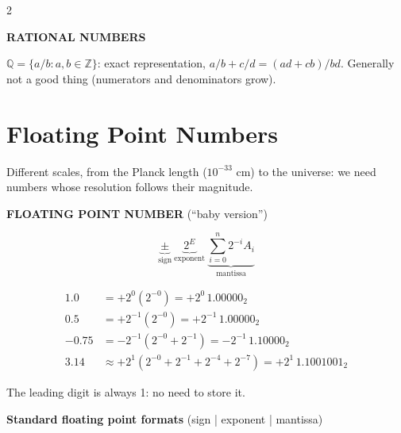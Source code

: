 \documentclass[a4paper,9pt]{extarticle}
\begin{document}
\begin{multicols}{2}
\begin{warning}
\begin{itemize}
\end{itemize}

\end{warning}


\begin{definition}

\textbf{RATIONAL NUMBERS}

$\mathbb{Q} = \{a/b : a, b \in \mathbb{Z}\}$: exact representation,
$a/b + c/d = (ad + cb)/bd$. Generally not a good thing (numerators and denominators grow).

\end{definition}



\section{Floating Point Numbers}


Different scales, from the Planck length ($10^{-33}$ cm) to the universe: we need numbers whose
resolution follows their magnitude.


\begin{definition}

\textbf{FLOATING POINT NUMBER} (``baby version'')

\[
\underbrace{\pm}_{\text{sign}} \ \underbrace{2^E}_{\text{exponent}}
\ \underbrace{\sum_{i=0}^{n} 2^{-i} A_i}_{\text{mantissa}}
\]

\end{definition}


\begin{example}

\begin{align*}
1.0 &= +2^0 (2^{-0}) = +2^0\,1.00000_2 \\
0.5 &= +2^{-1} (2^{-0}) = +2^{-1}\,1.00000_2 \\
-0.75 &= -2^{-1} (2^{-0} + 2^{-1}) = -2^{-1}\,1.10000_2 \\
3.14 &\approx +2^1 (2^{-0} + 2^{-1} + 2^{-4} + 2^{-7}) = +2^1\,1.1001001_2
\end{align*}

The leading digit is always 1: no need to store it.

\end{example}


\textbf{Standard floating point formats} (sign | exponent | mantissa)

\begin{center}


\end{center}
\end{multicols}
\end{document}
